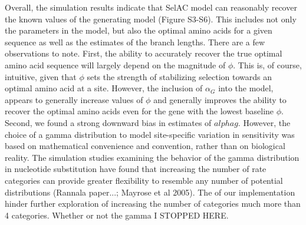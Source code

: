 \documentclass{article}
\newcommand{\alphag}{\ensuremath{\alpha_G}\xspace}
\begin{document}
Overall, the simulation results indicate that SelAC model can reasonably recover the known values of the generating model (Figure S3-S6).
This includes not only the parameters in the model, but also the optimal amino acids for a given sequence as well as the estimates of the branch lengths.
There are a few observations to note.
First, the ability to accurately recover the true optimal amino acid sequence will largely depend on the magnitude of $\phi$.
This is, of course, intuitive, given that $\phi$ sets the strength of stabilizing selection towards an optimal amino acid at a site.
However, the inclusion of $\alphag$ into the model, appears to generally increase values of $\phi$ and generally improves the ability to recover the optimal amino acids even for the gene with the lowest baseline $\phi$.
Second, we found a strong downward bias in estimates of $alphag$. 
However, the choice of a gamma distribution to model site-specific variation in sensitivity was based on mathematical convenience and convention, rather than on biological reality.
The simulation studies examining the behavior of the gamma distribution in nucleotide substitution have found that increasing the number of rate categories can provide greater flexibility to resemble any number of potential distributions (Rannala paper...; Mayrose et al 2005).
The  of our implementation hinder further exploration of increasing the number of categories much more than 4 categories.
Whether or not the gamma I STOPPED HERE.
\end{document}
